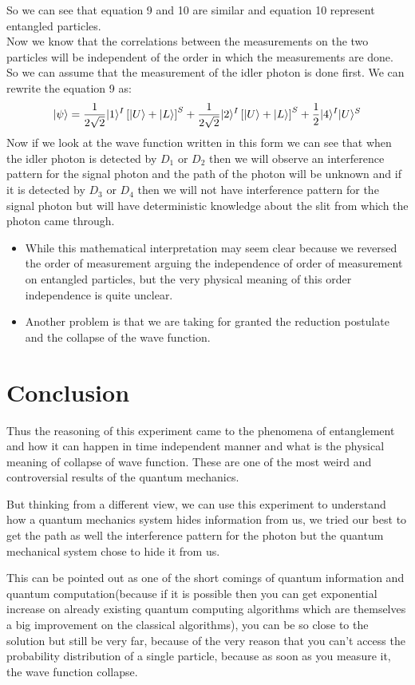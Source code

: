     So we can see that equation 9 and 10 are similar and equation 10 represent entangled particles. \\
    Now we know that the correlations between the measurements on the two particles will be independent of the order in which the measurements are done. So we can assume that the measurement of the idler photon is done first. We can rewrite the equation 9 as:
    \begin{equation}
        \lvert\psi\rangle = \frac{1}{2\sqrt{2}}\lvert1\rangle^I \left[\lvert U\rangle + \lvert L\rangle\right]^S + \frac{1}{2\sqrt{2}}\lvert2\rangle^I \left[\lvert U\rangle + \lvert L\rangle\right]^S + \frac{1}{2}\lvert4\rangle^I\lvert U\rangle^S
    \end{equation}
    Now if we look at the wave function written in this form we can see that when the idler photon is detected by $D_1$ or $D_2$ then we will observe an interference pattern for the signal photon and the path of the photon will be unknown and if it is detected by $D_3$ or $D_4$ then we will not have interference pattern for the signal photon but will have deterministic knowledge about the slit from which the photon came through.
    \begin{itemize}
        \item While this mathematical interpretation may seem clear because we reversed the order of measurement arguing the independence of order of measurement on entangled particles, but the very physical meaning of this order independence is quite unclear.
        \item Another problem is that we are taking for granted the reduction postulate and the collapse of the wave function.
    \end{itemize}
    \section{Conclusion}
    Thus the reasoning of this experiment came to the phenomena of entanglement and how it can happen in time independent manner and what is the physical meaning of collapse of wave function. These are one of the most weird and controversial results of the quantum mechanics. \\
    \par But thinking from a different view, we can use this experiment to understand how a quantum mechanics system hides information from us, we tried our best to get the path as well the interference pattern for the photon but the quantum mechanical system chose to hide it from us. \\
    \par This can be pointed out as one of the short comings of quantum information and quantum computation(because if it is possible then you can get exponential increase on already existing quantum computing algorithms which are themselves a big improvement on the classical algorithms), you can be so close to the solution but still be very far, because of the very reason that you can't access the probability distribution of a single particle, because as soon as you measure it, the wave function collapse.

